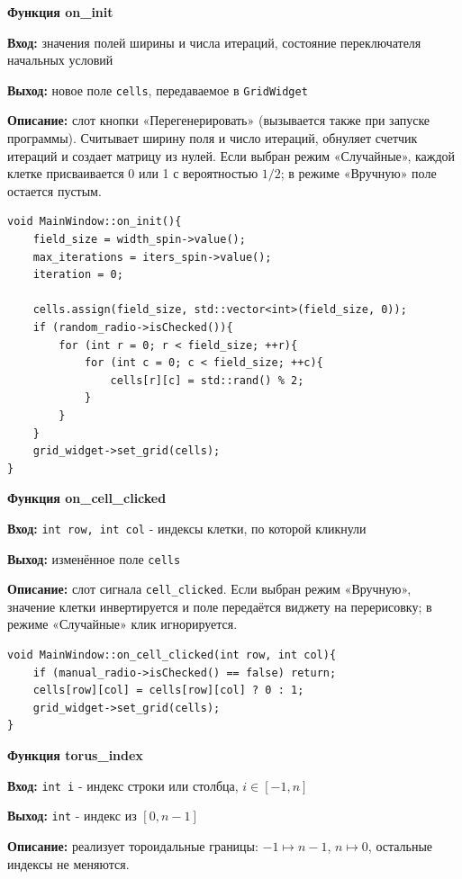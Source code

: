 \textbf{Функция on\_init} \par
\textbf{Вход:} значения полей ширины и числа итераций, состояние переключателя начальных условий \par
\textbf{Выход:} новое поле \texttt{cells}, передаваемое в \texttt{GridWidget} \par
\textbf{Описание:} слот кнопки «Перегенерировать» (вызывается также при запуске программы). Считывает ширину поля и число итераций, обнуляет счетчик итераций и создает матрицу из нулей. Если выбран режим «Случайные», каждой клетке присваивается 0 или 1 с вероятностью $1/2$; в режиме «Вручную» поле остается пустым.\par

\begin{lstlisting}[caption=on\_init, label=lst:init]
void MainWindow::on_init(){
    field_size = width_spin->value();
    max_iterations = iters_spin->value();
    iteration = 0;

    cells.assign(field_size, std::vector<int>(field_size, 0));
    if (random_radio->isChecked()){
        for (int r = 0; r < field_size; ++r){
            for (int c = 0; c < field_size; ++c){
                cells[r][c] = std::rand() % 2;
            }
        }
    }
    grid_widget->set_grid(cells);
}
\end{lstlisting}


\textbf{Функция on\_cell\_clicked} \par
\textbf{Вход:} \texttt{int row, int col} - индексы клетки, по которой кликнули \par
\textbf{Выход:} изменённое поле \texttt{cells} \par
\textbf{Описание:} слот сигнала \texttt{cell\_clicked}. Если выбран режим «Вручную», значение клетки инвертируется и поле передаётся виджету на перерисовку; в режиме «Случайные» клик игнорируется.\par

\begin{lstlisting}[caption=on\_cell\_clicked, label=lst:click]
void MainWindow::on_cell_clicked(int row, int col){
    if (manual_radio->isChecked() == false) return;
    cells[row][col] = cells[row][col] ? 0 : 1;
    grid_widget->set_grid(cells);
}
\end{lstlisting}

\vspace{6pt}
\textbf{Функция torus\_index} \par
\textbf{Вход:} \texttt{int i} - индекс строки или столбца, $i\in[-1,n]$ \par
\textbf{Выход:} \texttt{int} - индекс из $[0,n-1]$ \par
\textbf{Описание:} реализует тороидальные границы: $-1\mapsto n-1$, $n\mapsto 0$, остальные индексы не меняются.\par

